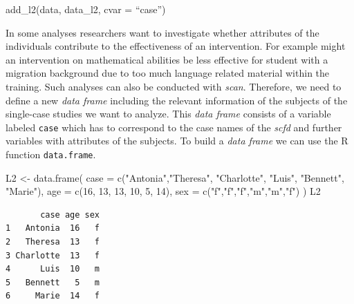\documentclass[
  letterpaper,
  DIV=11,
  numbers=noendperiod]{scrreprt}
\newenvironment{Shaded}{\begin{snugshade}}{\end{snugshade}}
\newcommand{\AttributeTok}[1]{\textcolor[rgb]{0.40,0.45,0.13}{#1}}
\newcommand{\DecValTok}[1]{\textcolor[rgb]{0.68,0.00,0.00}{#1}}
\newcommand{\FunctionTok}[1]{\textcolor[rgb]{0.28,0.35,0.67}{#1}}
\newcommand{\NormalTok}[1]{\textcolor[rgb]{0.00,0.23,0.31}{#1}}
\newcommand{\OtherTok}[1]{\textcolor[rgb]{0.00,0.23,0.31}{#1}}
\newcommand{\StringTok}[1]{\textcolor[rgb]{0.13,0.47,0.30}{#1}}
\begin{document}
\begin{tcolorbox}[enhanced jigsaw, toprule=.15mm, colframe=quarto-callout-tip-color-frame, left=2mm, colback=white, breakable, bottomrule=.15mm, arc=.35mm, rightrule=.15mm, leftrule=.75mm, opacityback=0]
\begin{minipage}[t]{5.5mm}
\textcolor{quarto-callout-tip-color}{\faLightbulb}
\end{minipage}%
\begin{minipage}[t]{\textwidth - 5.5mm}
add\_l2(data, data\_l2, cvar = ``case'')\end{minipage}%
\end{tcolorbox}

In some analyses researchers want to investigate whether attributes of
the individuals contribute to the effectiveness of an intervention. For
example might an intervention on mathematical abilities be less
effective for student with a migration background due to too much
language related material within the training. Such analyses can also be
conducted with \emph{scan}. Therefore, we need to define a new
\emph{data frame} including the relevant information of the subjects of
the single-case studies we want to analyze. This \emph{data frame}
consists of a variable labeled \texttt{case} which has to correspond to
the case names of the \emph{scfd} and further variables with attributes
of the subjects. To build a \emph{data frame} we can use the R function
\texttt{data.frame}.

\begin{Shaded}
\begin{Highlighting}[]
\NormalTok{L2 }\OtherTok{\textless{}{-}} \FunctionTok{data.frame}\NormalTok{(}
  \AttributeTok{case =} \FunctionTok{c}\NormalTok{(}\StringTok{"Antonia"}\NormalTok{,}\StringTok{"Theresa"}\NormalTok{, }\StringTok{"Charlotte"}\NormalTok{, }\StringTok{"Luis"}\NormalTok{, }\StringTok{"Bennett"}\NormalTok{, }\StringTok{"Marie"}\NormalTok{), }
  \AttributeTok{age =} \FunctionTok{c}\NormalTok{(}\DecValTok{16}\NormalTok{, }\DecValTok{13}\NormalTok{, }\DecValTok{13}\NormalTok{, }\DecValTok{10}\NormalTok{, }\DecValTok{5}\NormalTok{, }\DecValTok{14}\NormalTok{), }
  \AttributeTok{sex =} \FunctionTok{c}\NormalTok{(}\StringTok{"f"}\NormalTok{,}\StringTok{"f"}\NormalTok{,}\StringTok{"f"}\NormalTok{,}\StringTok{"m"}\NormalTok{,}\StringTok{"m"}\NormalTok{,}\StringTok{"f"}\NormalTok{)}
\NormalTok{)}
\NormalTok{L2}
\end{Highlighting}
\end{Shaded}

\begin{verbatim}
       case age sex
1   Antonia  16   f
2   Theresa  13   f
3 Charlotte  13   f
4      Luis  10   m
5   Bennett   5   m
6     Marie  14   f
\end{verbatim}
\end{document}
